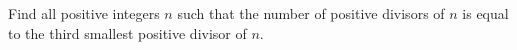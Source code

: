Find all positive integers $n$ such that the number of positive divisors
of $n$ is equal to the third smallest positive divisor of $n$.